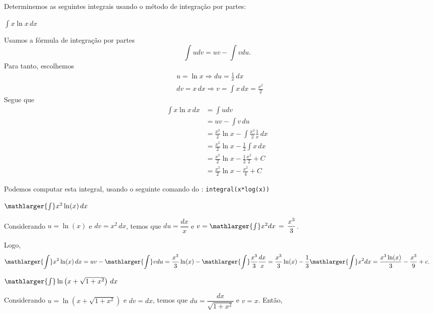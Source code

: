 \cleardoublepage\documentclass[../main.tex]{subfiles}
\begin{document}
\begin{exeresol}
  Determinemos as seguintes integrais usando o método de integração por partes:
  \begin{compactenum}[a)]
  \item $    \int x\ln x\,dx$
  
  \begin{solution}
  Usamos a fórmula de integração por partes
  \begin{equation*}
    \int udv = uv - \int vdu.
  \end{equation*}
  Para tanto, escolhemos
  \begin{align*}
    &u = \ln x \Rightarrow du = \frac{1}{x}\,dx\\
    &dv = x\,dx \Rightarrow v = \int x\,dx = \frac{x^2}{2}
  \end{align*}
  Segue que
  \begin{align*}
    \int x\ln x\,dx &= \int udv\\
                    &= uv - \int v\,du\\
                    &= \frac{x^2}{2}\ln x - \int \frac{x^2}{2}\frac{1}{x}\,dx\\
                    &= \frac{x^2}{2}\ln x - \frac{1}{2}\int x\,dx\\
                    &= \frac{x^2}{2}\ln x - \frac{1}{2}\frac{x^2}{2} + C\\
                    &= \frac{x^2}{2}\ln x - \frac{x^2}{4} + C
  \end{align*}

  
  Podemos computar esta integral, usando o seguinte comando do \geogebra: \verb|integral(x*log(x))|
  \end{solution}
  \item \(\mathlarger{\int} x^2\ln (x) \,dx\)
  
  \begin{solution}
  Considerando \(u=\ln (x)\) e \(dv=x^2\,dx \), temos que \(du = \dfrac{dx}{x}\) e \(v = \mathlarger{\int}x^{2} dx \, =\,\dfrac{x^3}{3}\).
  
  Logo,
\[ \mathlarger{\int}x^2\ln (x)\,dx=uv-\mathlarger{\int} v du =\dfrac{x^3}{3}\ln (x)- \mathlarger{\int} \dfrac{x^3}{3} \dfrac{dx}{x} =\dfrac{x^3}{3}\ln (x)- \dfrac{1}{3}\mathlarger{\int} x^2 dx =\dfrac{x^3 \ln (x)}{3}- \dfrac{x^3}{9}+c. \]
  \end{solution}
  \item \(\mathlarger{\int} \ln \left(x+\sqrt{1+x^2}\right) \,dx\)
  
  \begin{solution}
  Considerando \(u=\ln \left(x+\sqrt{1+x^2}\right)\) e \(dv=dx \), temos que \(du = \dfrac{dx}{\sqrt{1+x^2}}\) e \(v=x\). Então,


\end{solution}
\end{compactenum}
\end{exeresol}
\end{document}
